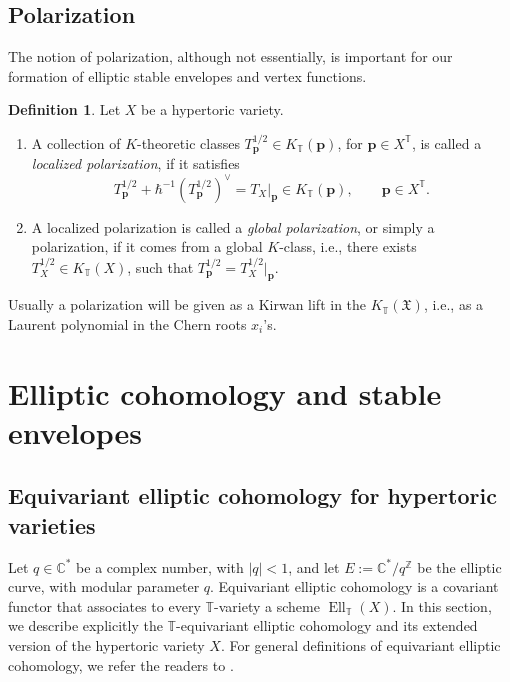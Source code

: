 \documentclass[10pt]{amsart}
\theoremstyle{definition}
\def\ZZ{{\mathbb{Z}}}
\def\CC{{\mathbb{C}}}
\def\TT{\mathbb{T}}
\newcommand{\bp}{\mathbf{p}}
\newcommand{\Ell}{\operatorname{Ell}}
\newcommand{\fX}{\mathfrak{X}}
\theoremstyle{definition}
\newtheorem{Definition}{Definition}[section]
\numberwithin{equation}{section}
\theoremstyle{Theorem}
\begin{document}
\subsection{Polarization}

The notion of polarization, although not essentially, is important for our formation of elliptic stable envelopes and vertex functions.

\begin{Definition} \label{Defn-pol}
Let $X$ be a hypertoric variety.
\begin{enumerate}[1)]
	
	\setlength{\parskip}{1ex}

\item A collection of $K$-theoretic classes $T^{1/2}_{\bp} \in K_\TT (\bp)$, for $\bp\in X^\TT$, is called a \emph{localized polarization}, if it satisfies
$$
T^{1/2}_\bp + \hbar^{-1} (T_\bp^{1/2})^\vee = T_X |_\bp  \in K_\TT (\bp), \qquad \bp \in X^\TT.
$$

\item A localized polarization is called a \emph{global polarization}, or simply a polarization, if it comes from a global $K$-class, i.e., there exists $T_X^{1/2} \in K_\TT (X)$, such that $T^{1/2}_\bp = T_X^{1/2} |_\bp$.

\end{enumerate}

\end{Definition}

Usually a polarization will be given as a Kirwan lift in the $K_\TT (\fX)$, i.e., as a Laurent polynomial in the Chern roots $x_i$'s.


\vspace{3ex}





\section{Elliptic cohomology and stable envelopes}


\subsection{Equivariant elliptic cohomology for hypertoric varieties}

Let $q\in \CC^*$ be a complex number, with $|q|<1$, and let $E := \CC^* / q^\ZZ$ be the elliptic curve, with modular parameter $q$. Equivariant elliptic cohomology is a covariant functor that associates to every $\TT$-variety a scheme $\Ell_\TT (X)$. In this section, we describe explicitly the $\TT$-equivariant elliptic cohomology and its extended version of the hypertoric variety $X$. For general definitions of equivariant elliptic cohomology, we refer the readers to \cite{ell1,ell2,ell3,ell4,ell5,ell6}.
\end{document}
